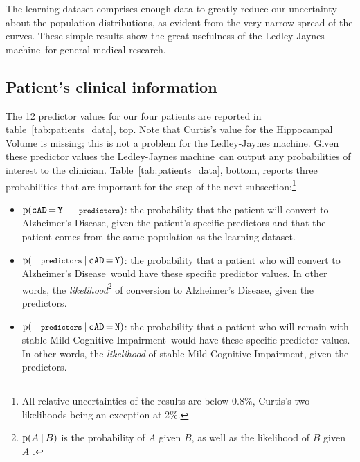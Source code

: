 \documentclass[utf8]{FrontiersinHarvard} %
\newcommand*{\mo}[1][=]{\mathord{\,#1\,}}
\newcommand*{\sect}{\S}%
\newcommand*{\p}{\mathrm{p}}%
\renewcommand*{\|}[1][]{\nonscript\:#1\vert\nonscript\:\mathopen{}}
\newcommand*{\cad}{\texttt{cAD}}
\newcommand*{\yes}{\texttt{Y}}
\newcommand*{\no}{\texttt{N}}
\newcommand*{\predictors}{\texttt{\footnotesize predictors}}
\newcommand*{\ad}{Alzheimer's Disease}
\newcommand*{\mci}{Mild Cognitive Impairment}
\newcommand*{\ljm}{Ledley-Jaynes machine}
\begin{document}
The learning dataset comprises enough data to greatly reduce our uncertainty about the population distributions, as evident from the very narrow spread of the curves. These simple results show the great usefulness of the \ljm\ for general medical research.


\subsection{Patient's clinical information}
\label{sec:predictor_step}

The 12 predictor values for our four patients are reported in table~\ref{tab:patients_data}, top. Note that Curtis's value for the Hippocampal Volume is missing; this is not a problem for the \ljm. Given these predictor values the \ljm\ can output any probabilities of interest to the clinician. Table~\ref{tab:patients_data}, bottom, reports three probabilities that are important for the step of the next subsection:\footnote{All relative uncertainties of the results are below 0.8\%, Curtis's two likelihoods being an exception at 2\%.}
\begin{itemize}
\item $\p(\cad\mo\yes \| \predictors)$: the probability that the patient will convert to \ad, given the patient's specific predictors and that the patient comes from the same population as the learning dataset.
\item $\p(\predictors \| \cad\mo\yes)$: the probability that a patient who will convert to \ad\ would have these specific predictor values. In other words, the \emph{likelihood}\footnote{$\p(A\|B)$ is the probability of $A$ given $B$, as well as the likelihood of $B$ given $A$ \citep[\sect~6.1]{good1950}.} of conversion to \ad, given the predictors.
\item $\p(\predictors \| \cad\mo\no)$: the probability that a patient who will remain with stable \mci\ would have these specific predictor values. In other words, the \emph{likelihood} of stable \mci, given the predictors.
\end{itemize}
\end{document}
